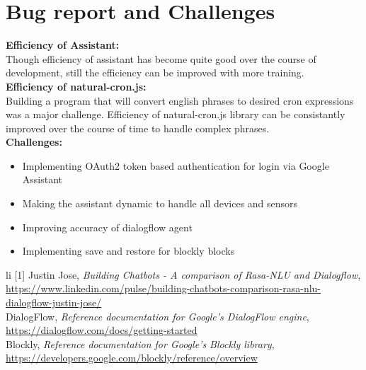 \documentclass[a4paper,12pt,oneside]{book}
\begin{document}
\section{Bug report and Challenges}
\textbf{Efficiency of Assistant:}
\\Though efficiency of assistant has become quite good over the course of development, still the efficiency can be improved with more training.
\\\newline\textbf{Efficiency of natural-cron.js:}
\\Building a program that will convert english phrases to desired cron expressions was a major challenge. Efficiency of natural-cron.js library can be consistantly improved over the course of time to handle complex phrases.
\\\newline\textbf{Challenges:}
\begin{itemize}
\item Implementing OAuth2 token based authentication for login via Google Assistant
\item Making the assistant dynamic to handle all devices and sensors
\item Improving accuracy of dialogflow agent
\item Implementing save and restore for blockly blocks
\end{itemize}

\begin{thebibliography}{li}
[1] Justin Jose,
{\em Building Chatbots - A comparison of Rasa-NLU and Dialogflow},
\href{https://www.linkedin.com/pulse/building-chatbots-comparison-rasa-nlu-dialogflow-justin-jose/}{https://www.linkedin.com/pulse/building-chatbots-comparison-rasa-nlu-dialogflow-justin-jose/}
\\\newline
[2] DialogFlow,
{\em Reference documentation for Google's DialogFlow engine},
\href{https://dialogflow.com/docs/getting-started}{https://dialogflow.com/docs/getting-started}
\\\newline
[3] Blockly,
{\em Reference documentation for Google's Blockly library},
\href{https://developers.google.com/blockly/reference/overview}{https://developers.google.com/blockly/reference/overview}
\end{thebibliography}
\end{document}
